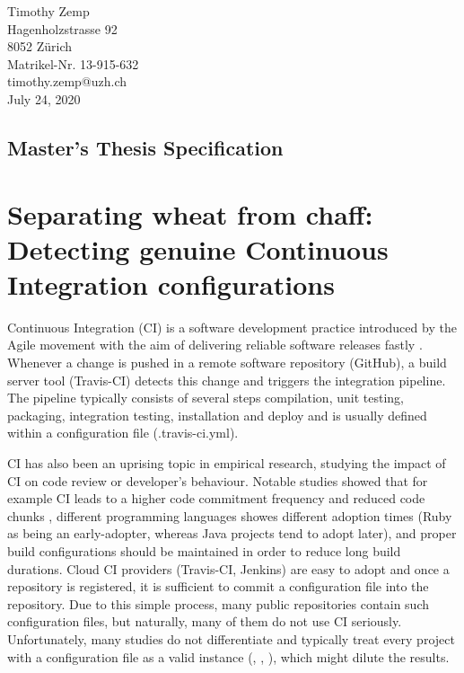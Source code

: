 \documentclass{task_description}
\begin{document}
\thispagestyle{firstpage}
\vspace*{23mm}%
\hfill\parbox[t]{65mm}{

Timothy Zemp\\
Hagenholzstrasse 92\\
8052 Z\"urich\\[5mm]
Matrikel-Nr. 13-915-632\\
timothy.zemp@uzh.ch\\[15mm]
July 24, 2020 \\
}
\vspace*{5mm}
\subsection*{Master's Thesis Specification}
%
\section*{Separating wheat from chaff: Detecting genuine Continuous Integration configurations\hspace{1em}}

Continuous Integration (CI) is a software development practice introduced by the Agile movement with the aim of delivering reliable software releases fastly \cite{Humble:2010}. Whenever a change is pushed in a remote software repository (\eg GitHub), a build server tool (\eg Travis-CI) detects this change and triggers the integration pipeline. The pipeline typically consists of several steps \eg compilation, unit testing, packaging, integration testing, installation and deploy and is usually defined within a configuration file (\eg .travis-ci.yml).

CI has also been an uprising topic in empirical research, studying the impact of CI on code review or developer's behaviour. Notable studies showed that for example CI leads to a higher code commitment frequency and reduced code chunks \cite{zhao2017impact}, different programming languages showes different adoption times (\eg Ruby as being an early-adopter, whereas Java projects tend to adopt later)\cite{vasilescu2014continuous}, and proper build configurations should be maintained in order to reduce long build durations\cite{ghaleb2019empirical}.
Cloud CI providers (\eg Travis-CI, Jenkins) are easy to adopt and once a repository is registered, it is sufficient to commit a configuration file into the repository. Due to this simple process, many public repositories contain such configuration files, but naturally, many of them do not use CI seriously. Unfortunately, many studies do not differentiate and typically treat every project with a configuration file as a valid instance (\eg \cite{zhao2017impact}, \cite{vasilescu2014continuous}, \cite{ghaleb2019empirical}), which might dilute the results. 
\end{document}
